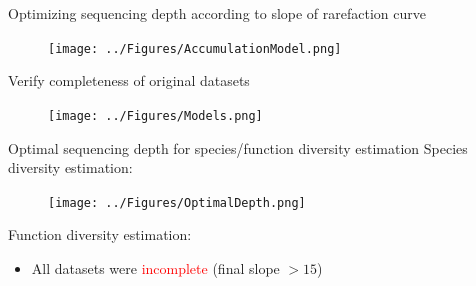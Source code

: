 \documentclass{beamer}
\begin{document}
\begin{frame}{Optimizing sequencing depth according to slope of rarefaction curve}
    \begin{figure}
        \texttt{[image: ../Figures/AccumulationModel.png]}
    \end{figure}
\end{frame}

\begin{frame}{Verify completeness of original datasets}
    \begin{figure}
        \texttt{[image: ../Figures/Models.png]}
    \end{figure}
\end{frame}

\begin{frame}{Optimal sequencing depth for species/function diversity estimation}
    Species diversity estimation:
    \begin{figure}
        \texttt{[image: ../Figures/OptimalDepth.png]}
    \end{figure}
    Function diversity estimation:
    \begin{itemize}
        \item All datasets were \textcolor{red}{incomplete} (final slope $> 15$)
    \end{itemize}  
\end{frame}
\end{document}
